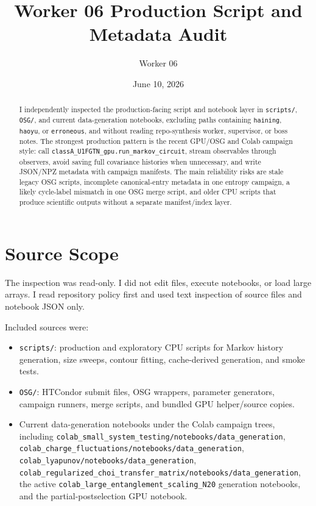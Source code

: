 \documentclass[aps,prb,onecolumn,nofootinbib,superscriptaddress]{revtex4-2}
\begin{document}
\title{Worker 06 Production Script and Metadata Audit}
\author{Worker 06}
\date{June 10, 2026}

\begin{abstract}
I independently inspected the production-facing script and notebook layer in
\texttt{scripts/}, \texttt{OSG/}, and current data-generation notebooks, excluding
paths containing \texttt{haining}, \texttt{haoyu}, or \texttt{erroneous}, and without
reading repo-synthesis worker, supervisor, or boss notes.  The strongest production
pattern is the recent GPU/OSG and Colab campaign style: call
\texttt{classA\_U1FGTN\_gpu.run\_markov\_circuit}, stream observables through
observers, avoid saving full covariance histories when unnecessary, and write
JSON/NPZ metadata with campaign manifests.  The main reliability risks are stale
legacy OSG scripts, incomplete canonical-entry metadata in one entropy campaign,
a likely cycle-label mismatch in one OSG merge script, and older CPU scripts that
produce scientific outputs without a separate manifest/index layer.
\end{abstract}

\maketitle
\tableofcontents

\section{Source Scope}

The inspection was read-only.  I did not edit files, execute notebooks, or load
large arrays.  I read repository policy first and used text inspection of source
files and notebook JSON only.

Included sources were:
\begin{itemize}
\item \texttt{scripts/}: production and exploratory CPU scripts for Markov
history generation, size sweeps, contour fitting, cache-derived generation, and
smoke tests.
\item \texttt{OSG/}: HTCondor submit files, OSG wrappers, parameter generators,
campaign runners, merge scripts, and bundled GPU helper/source copies.
\item Current data-generation notebooks under the Colab campaign trees, including
\texttt{colab\_small\_system\_testing/notebooks/data\_generation},
\texttt{colab\_charge\_fluctuations/notebooks/data\_generation},
\texttt{colab\_lyapunov/notebooks/data\_generation},
\texttt{colab\_regularized\_choi\_transfer\_matrix/notebooks/data\_generation},
the active \texttt{colab\_large\_entanglement\_scaling\_N20} generation notebooks,
and the partial-postselection GPU notebook.
\end{itemize}
\end{document}
